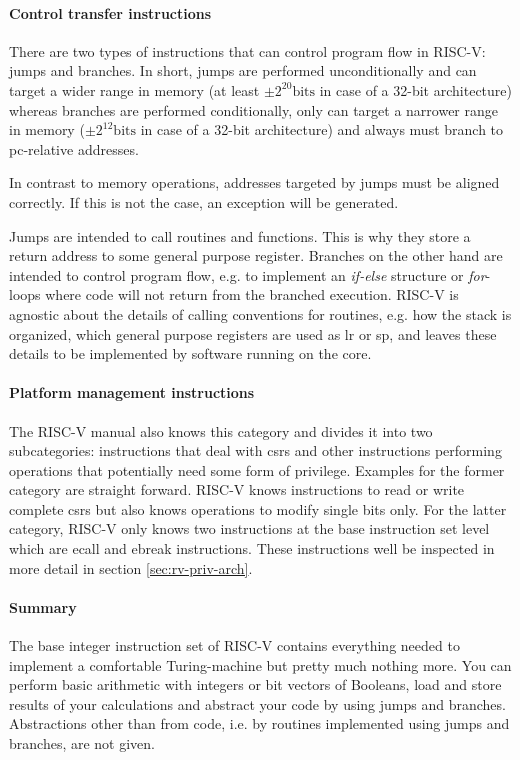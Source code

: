 \paragraph{Control transfer instructions}
There are two types of instructions that can control program flow in RISC-V: jumps and branches.
In short, jumps are performed unconditionally and can target a wider range in memory (at least $ \pm 2^{20}\text{bits} $ in case of a 32-bit architecture) whereas branches are performed conditionally, only can target a narrower range in memory ($ \pm 2^{12}\text{bits} $ in case of a 32-bit architecture) and always must branch to \gls{pc}-relative addresses.

In contrast to memory operations, addresses targeted by jumps must be aligned correctly.
If this is not the case, an exception will be generated.

Jumps are intended to call routines and functions.
This is why they store a return address to some general purpose register.
Branches on the other hand are intended to control program flow, e.g. to implement an \textit{if-else} structure or \textit{for}-loops where code will not return from the branched execution.
RISC-V is agnostic about the details of calling conventions for routines, e.g. how the stack is organized, which general purpose registers are used as \gls{lr} or \gls{sp}, and leaves these details to be implemented by software running on the core.

\paragraph{Platform management instructions}
The RISC-V manual also knows this category and divides it into two subcategories: instructions that deal with \glspl{csr} and other instructions performing operations that potentially need some form of privilege.
Examples for the former category are straight forward.
RISC-V knows instructions to read or write complete \glspl{csr} but also knows operations to modify single bits only.
For the latter category, RISC-V only knows two instructions at the base instruction set level which are \gls{ecall} and \gls{ebreak} instructions.
These instructions well be inspected in more detail in section \ref{sec:rv-priv-arch}.

\paragraph{Summary}
The base integer instruction set of RISC-V contains everything needed to implement a comfortable Turing-machine but pretty much nothing more.
You can perform basic arithmetic with integers or bit vectors of Booleans, load and store results of your calculations and abstract your code by using jumps and branches.
Abstractions other than from code, i.e. by routines implemented using jumps and branches, are not given.

